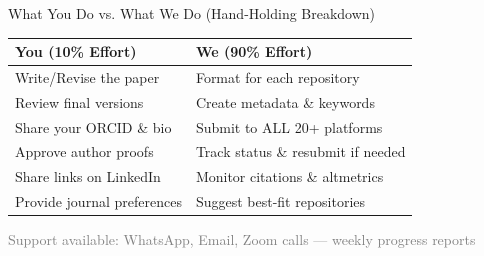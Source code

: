 \documentclass[10pt, aspectratio=169]{beamer}
\begin{document}

\begin{frame}{What You Do vs. What We Do (Hand-Holding Breakdown)}
	\begin{table}
		\centering
		\begin{tabular}{p{5cm} p{5cm}}
			\toprule
			\textbf{You (10\% Effort)} & \textbf{We (90\% Effort)} \\
			\midrule
			Write/Revise the paper & Format for each repository \\
			Review final versions & Create metadata \& keywords \\
			Share your ORCID \& bio & Submit to ALL 20+ platforms \\
			Approve author proofs & Track status \& resubmit if needed \\
			Share links on LinkedIn & Monitor citations \& altmetrics \\
			Provide journal preferences & Suggest best-fit repositories \\
			\bottomrule
		\end{tabular}
	\end{table}
	
	\vspace{0.5cm}
	\begin{center}
	\end{center}
	
	\vspace{0.3cm}
	\begin{center}
		\tiny{\textcolor{gray}{Support available: WhatsApp, Email, Zoom calls — weekly progress reports}}
	\end{center}
\end{frame}
\end{document}
